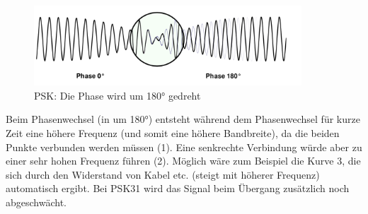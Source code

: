 \begin{figure}[h!]
 \centering
 \includegraphics[width=10cm]{./png/Amfu-PSK.png}
 \caption{PSK: Die Phase wird um 180° gedreht}
 \label{fig:psk}
\end{figure}

Beim Phasenwechsel (in  um 180°) entsteht während dem Phasenwechsel für kurze Zeit eine höhere Frequenz (und somit eine höhere Bandbreite), da die beiden Punkte verbunden werden müssen (1). Eine senkrechte Verbindung würde aber zu einer sehr hohen Frequenz führen (2). Möglich wäre zum Beispiel die Kurve 3, die sich durch den Widerstand von Kabel etc. (steigt mit höherer Frequenz) automatisch ergibt. Bei PSK31 wird das Signal beim Übergang zusätzlich noch abgeschwächt.